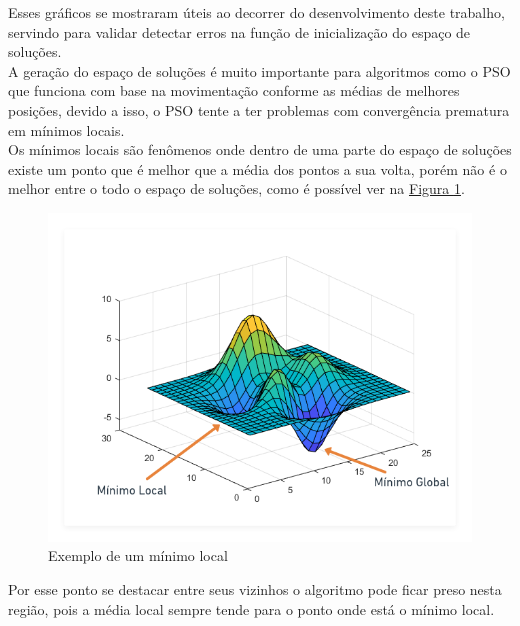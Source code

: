 Esses gráficos se mostraram úteis ao decorrer do desenvolvimento deste trabalho, servindo para validar detectar erros na função de inicialização do espaço de soluções.\\
\indent A geração do espaço de soluções é muito importante para algoritmos como o PSO 
que funciona com base na movimentação conforme as médias de melhores posições, 
devido a isso, o PSO tente a ter problemas com convergência prematura em mínimos locais.\\
\indent Os mínimos locais são fenômenos onde dentro de uma parte do espaço de soluções existe um ponto que é melhor que a média dos pontos a sua volta, porém não é o melhor entre o todo o espaço de soluções, como é possível ver na \hyperref[fig:ex-minimolocal]{Figura \ref{fig:ex-minimolocal}}.\newline
\begin{figure}[ht]
    \centering
    \caption{Exemplo de um mínimo local}
    \label{fig:ex-minimolocal}
    \includegraphics[width=\textwidth]{assets/minimo_local.png}
\end{figure}
Por esse ponto se destacar entre seus vizinhos o algoritmo pode ficar preso nesta região, pois a média local sempre tende para o ponto onde está o mínimo local.\\
